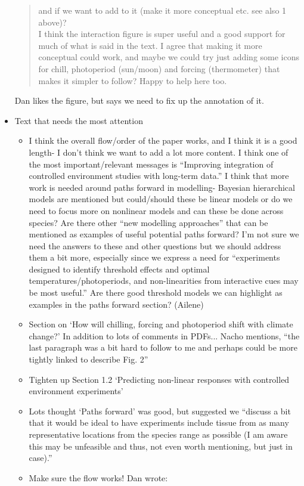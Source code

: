 \documentclass[11pt,letterpaper]{article}
\begin{document}
\begin{itemize}
\begin{quote}
and if we want to add to it (make it more conceptual etc. see also 1 above)?\\
I think the interaction figure is super useful and a good support for much of what is said in the text. I agree that making it more conceptual could work, and maybe we could try just adding some icons for chill, photoperiod (sun/moon) and forcing (thermometer) that makes it simpler to follow? Happy to help here too.
\end{quote}
Dan likes the figure, but says we need to fix up the annotation of it.
\item Text that needs the most attention
\begin{itemize}
\item I think the overall flow/order of the paper works, and I think it is a good length- I don’t think we want to add a lot more content. I think one of the most important/relevant messages is “Improving integration of controlled environment studies with long-term data.” I think that more work is needed around paths forward in modelling- Bayesian hierarchical models are mentioned but could/should these be linear models or do we need to focus more on nonlinear models and can these be done across species? Are there other “new modelling approaches” that can be mentioned as examples of useful potential paths forward? I’m not sure we need the answers to these and other questions but we should address them a bit more, especially since we express a need for “experiments designed to identify threshold effects and optimal temperatures/photoperiods, and non-linearities from interactive cues may be most useful.” Are there good threshold models we can highlight as examples in the paths forward section? (Ailene)
\item Section on `How will chilling, forcing and photoperiod shift with climate change?' In addition to lots of comments in PDFs... Nacho mentions, ``the last paragraph was a bit hard to follow to me and perhaps could be more tightly linked to describe Fig. 2''
\item Tighten up Section 1.2 `Predicting non-linear responses with controlled environment experiments'
\item Lots thought `Paths forward' was good, but suggested we ``discuss a bit that it would be ideal to have experiments include tissue from as many representative locations from the species range as possible (I am aware this may be unfeasible and thus, not even worth mentioning, but just in case).''
\item Make sure the flow works! Dan wrote:

\end{itemize}
\end{itemize}
\end{document}
